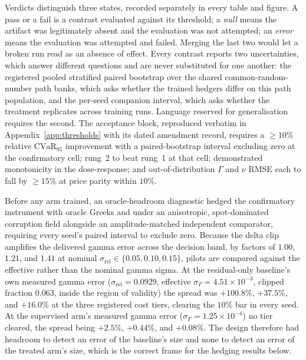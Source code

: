 \documentclass[10pt]{article}
\begin{document}
Verdicts distinguish three states, recorded separately in every table and figure. A
pass or a fail is a contrast evaluated against its threshold; a \emph{null} means the
artifact was legitimately absent and the evaluation was not attempted; an
\emph{error} means the evaluation was attempted and failed. Merging the last two
would let a broken run read as an absence of effect. Every contrast reports two
uncertainties, which answer different questions and are never substituted for one
another: the registered pooled stratified paired bootstrap over the shared
common-random-number path banks, which asks whether the trained hedgers differ on
this path population, and the per-seed companion interval, which asks whether the
treatment replicates across training runs. Language reserved for generalisation
requires the second. The acceptance block, reproduced verbatim in
Appendix~\ref{app:thresholds} with its dated amendment record, requires a
$\geq10\%$ relative $\mathrm{CVaR}_{95}$ improvement with a paired-bootstrap
interval excluding zero at the confirmatory cell; rung~2 to beat rung~1 at that
cell; demonstrated monotonicity in the dose-response; and out-of-distribution
$\Gamma$ and $\nu$ RMSE each to fall by $\geq15\%$ at price parity within $10\%$.

Before any arm trained, an oracle-headroom diagnostic hedged the confirmatory
instrument with oracle Greeks and under an anisotropic, spot-dominated corruption
field alongside an amplitude-matched independent comparator, requiring every seed's
paired interval to exclude zero. Because the delta clip amplifies the delivered
gamma error across the decision band, by factors of $1.00$, $1.21$, and $1.41$ at
nominal $\sigma_{\mathrm{rel}}\in\{0.05,0.10,0.15\}$, pilots are compared against
the effective rather than the nominal gamma sigma. At the residual-only baseline's
own measured gamma error ($\sigma_{\mathrm{rel}}=0.0929$, effective
$\sigma_\Gamma=4.51\times10^{-3}$, clipped fraction $0.063$, inside the region of
validity) the spread was $+100.8\%$, $+37.5\%$, and $+16.0\%$ at the three
registered cost tiers, clearing the $10\%$ bar in every seed. At the supervised
arm's measured gamma error ($\sigma_\Gamma=1.25\times10^{-4}$) no tier cleared, the
spread being $+2.5\%$, $+0.44\%$, and $+0.08\%$. The design therefore had headroom
to detect an error of the baseline's size and none to detect an error of the treated
arm's size, which is the correct frame for the hedging results below.

\end{document}

